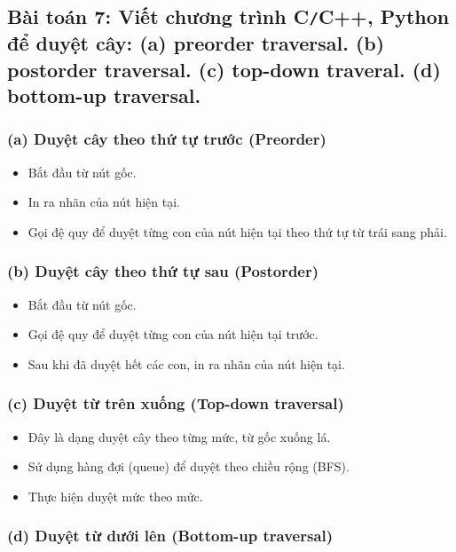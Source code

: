 \documentclass{article}
\begin{document}
	\subsection*{Bài toán 7: Viết chương trình {\sf C{\tt/}C++, Python} để duyệt cây: (a) preorder traversal. (b) postorder traversal. (c) top-down traveral. (d) bottom-up traversal.}
	
	\subsubsection*{(a) Duyệt cây theo thứ tự trước (Preorder)}
	
	\begin{itemize}[itemsep=0.5em]
		\item Bắt đầu từ nút gốc.
		\item In ra nhãn của nút hiện tại.
		\item Gọi đệ quy để duyệt từng con của nút hiện tại theo thứ tự từ trái sang phải.
	\end{itemize}
	
	
	\subsubsection*{(b) Duyệt cây theo thứ tự sau (Postorder)}
	
	\begin{itemize}[itemsep=0.5em]
		\item Bắt đầu từ nút gốc.
		\item Gọi đệ quy để duyệt từng con của nút hiện tại trước.
		\item Sau khi đã duyệt hết các con, in ra nhãn của nút hiện tại.
	\end{itemize}
	
	\subsubsection*{(c) Duyệt từ trên xuống (Top-down traversal)}
	
	\begin{itemize}[itemsep=0.5em]
		\item Đây là dạng duyệt cây theo từng mức, từ gốc xuống lá.
		\item Sử dụng hàng đợi (queue) để duyệt theo chiều rộng (BFS).
		\item Thực hiện duyệt mức theo mức.
	\end{itemize}
	
	\subsubsection*{(d) Duyệt từ dưới lên (Bottom-up traversal)}
	
\end{document}
